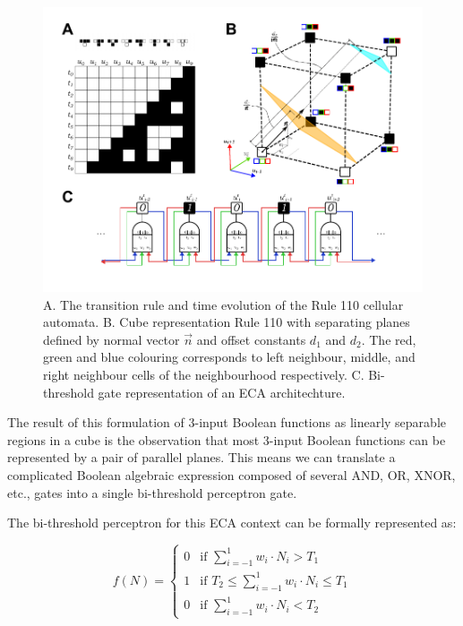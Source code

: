 \begin{figure}[ht]
    
    \centering
    \includegraphics[width=\textwidth]{images/SVGs/Cube.pdf}
    \caption{A. The transition rule and time evolution of the Rule 110 cellular automata. B. Cube representation Rule 110 with separating planes defined by normal vector $\overrightarrow{n}$ and offset constants $d_1$ and $d_2$. The red, green and blue colouring corresponds to left neighbour, middle, and right neighbour cells of the neighbourhood respectively. C. Bi-threshold gate representation of an ECA architechture.}
    \label{fig:cube}
\end{figure}


The result of this formulation of 3-input Boolean functions as linearly separable regions in a cube is the observation that most 3-input Boolean functions can be represented by a pair of parallel planes. This means we can translate a complicated Boolean algebraic expression composed of several AND, OR, XNOR, etc., gates into a single bi-threshold perceptron gate.

The bi-threshold perceptron for this ECA context can be formally represented as:

\[
f(N) = \begin{cases} 
0 & \text{if } \sum_{i=-1}^{1} w_i \cdot N_i > T_1 \\
1 & \text{if } T_2 \leq \sum_{i=-1}^{1} w_i \cdot N_i \leq T_1 \\
0 & \text{if } \sum_{i=-1}^{1} w_i \cdot N_i < T_2
\end{cases}
\]


